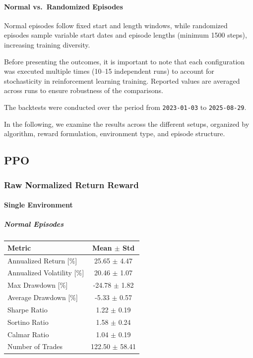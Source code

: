 \documentclass[12pt,a4paper]{report}
\begin{document}
\paragraph{Normal vs.\ Randomized Episodes}
Normal episodes follow fixed start and length windows, 
while randomized episodes sample variable start dates and episode lengths 
(minimum 1500 steps), increasing training diversity.

\vspace{0.75cm}

Before presenting the outcomes, it is important to note that each configuration was 
executed multiple times (10--15 independent runs) to account for stochasticity in 
reinforcement learning training. Reported values are averaged across runs to ensure 
robustness of the comparisons. 

The backtests were conducted over the period from \texttt{2023-01-03} to 
\texttt{2025-08-29}. 

In the following, we examine the results across the different setups, organized by 
algorithm, reward formulation, environment type, and episode structure.


\subsection{PPO}

\subsubsection{Raw Normalized Return Reward}

\paragraph{Single Environment}

\subparagraph{Normal Episodes}

\begin{center}
\begin{tabular}{l c}
\toprule
\textbf{Metric} & \textbf{Mean $\pm$ Std} \\
\midrule
Annualized Return [\%]      & 25.65 $\pm$ 4.47 \\
Annualized Volatility [\%]  & 20.46 $\pm$ 1.07 \\
Max Drawdown [\%]           & -24.78 $\pm$ 1.82 \\
Average Drawdown [\%]       & -5.33 $\pm$ 0.57 \\
Sharpe Ratio                & 1.22 $\pm$ 0.19 \\
Sortino Ratio               & 1.58 $\pm$ 0.24 \\
Calmar Ratio                & 1.04 $\pm$ 0.19 \\
Number of Trades            & 122.50 $\pm$ 58.41 \\
\bottomrule
\end{tabular}
\label{tab:ppo-raw-1env-normal}
\end{center}
\end{document}
